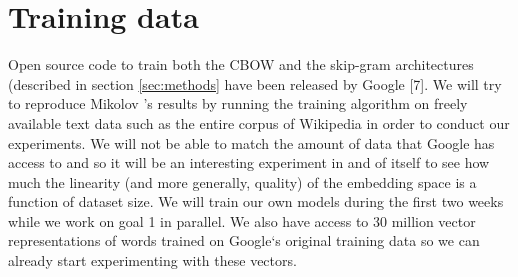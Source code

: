 \section{Training data}\label{sec:train_data}

Open source code to train both the CBOW and the skip-gram architectures (described in section \ref{sec:methods} have been released by Google [7]. 
We will try to reproduce Mikolov \etal 's results by running the training algorithm on freely available text data such as the entire corpus of Wikipedia in order to conduct our experiments. 
We will not be able to match the amount of data that Google has access to and so it will be an interesting experiment in and of itself to see how much the linearity (and more generally, quality) of the embedding space is a function of dataset size. 
We will train our own models during the first two weeks while we work on goal 1 in parallel.  
We also have access to 30 million vector representations of words trained on Google`s original training data so we can already start experimenting with these vectors. 

